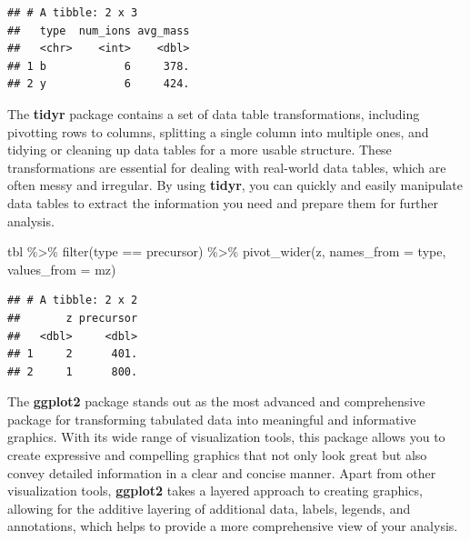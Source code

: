 \documentclass[
]{book}
\newenvironment{Shaded}{\begin{snugshade}}{\end{snugshade}}
\newcommand{\AttributeTok}[1]{\textcolor[rgb]{0.77,0.63,0.00}{#1}}
\newcommand{\FunctionTok}[1]{\textcolor[rgb]{0.00,0.00,0.00}{#1}}
\newcommand{\NormalTok}[1]{#1}
\newcommand{\SpecialCharTok}[1]{\textcolor[rgb]{0.00,0.00,0.00}{#1}}
\newcommand{\StringTok}[1]{\textcolor[rgb]{0.31,0.60,0.02}{#1}}
\begin{document}
\begin{verbatim}
## # A tibble: 2 x 3
##   type  num_ions avg_mass
##   <chr>    <int>    <dbl>
## 1 b            6     378.
## 2 y            6     424.
\end{verbatim}

The \textbf{tidyr} package contains a set of data table transformations, including pivotting rows to columns, splitting a single column into multiple ones, and tidying or cleaning up data tables for a more usable structure. These transformations are essential for dealing with real-world data tables, which are often messy and irregular. By using \textbf{tidyr}, you can quickly and easily manipulate data tables to extract the information you need and prepare them for further analysis.

\begin{Shaded}
\begin{Highlighting}[]
\NormalTok{tbl }\SpecialCharTok{\%\textgreater{}\%} 
  \FunctionTok{filter}\NormalTok{(type }\SpecialCharTok{==} \StringTok{\textquotesingle{}precursor\textquotesingle{}}\NormalTok{) }\SpecialCharTok{\%\textgreater{}\%} 
  \FunctionTok{pivot\_wider}\NormalTok{(z, }\AttributeTok{names\_from =} \StringTok{\textquotesingle{}type\textquotesingle{}}\NormalTok{, }\AttributeTok{values\_from =} \StringTok{\textquotesingle{}mz\textquotesingle{}}\NormalTok{)}
\end{Highlighting}
\end{Shaded}

\begin{verbatim}
## # A tibble: 2 x 2
##       z precursor
##   <dbl>     <dbl>
## 1     2      401.
## 2     1      800.
\end{verbatim}

The \textbf{ggplot2} package stands out as the most advanced and comprehensive package for transforming tabulated data into meaningful and informative graphics. With its wide range of visualization tools, this package allows you to create expressive and compelling graphics that not only look great but also convey detailed information in a clear and concise manner. Apart from other visualization tools, \textbf{ggplot2} takes a layered approach to creating graphics, allowing for the additive layering of additional data, labels, legends, and annotations, which helps to provide a more comprehensive view of your analysis.
\end{document}
